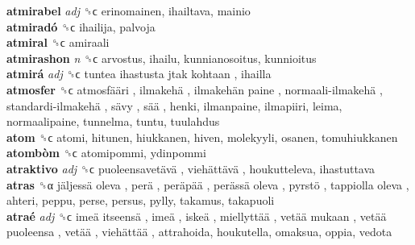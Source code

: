 \textbf{atmirabel} \emph{adj}  ␝ϲ  erinomainen, ihailtava, mainio  \\
\textbf{atmiradó} ␝ϲ  ihailija, palvoja  \\
\textbf{atmiral} ␝ϲ  amiraali  \\
\textbf{atmirashon} \emph{n}  ␝ϲ  arvostus, ihailu, kunnianosoitus, kunnioitus  \\
\textbf{atmirá} \emph{adj}  ␝ϲ   tuntea ihastusta jtak kohtaan , ihailla  \\
\textbf{atmosfer} ␝ϲ   atmosfääri ,  ilmakehä ,  ilmakehän paine ,  normaali-ilmakehä ,  standardi-ilmakehä ,  sävy ,  sää , henki, ilmanpaine, ilmapiiri, leima, normaalipaine, tunnelma, tuntu, tuulahdus  \\
\textbf{atom} ␝ϲ  atomi, hitunen, hiukkanen, hiven, molekyyli, osanen, tomuhiukkanen  \\
\textbf{atombòm} ␝ϲ  atomipommi, ydinpommi  \\
\textbf{atraktivo} \emph{adj}  ␝ϲ   puoleensavetävä ,  viehättävä , houkutteleva, ihastuttava  \\
\textbf{atras} ␝α   jäljessä oleva ,  perä ,  peräpää ,  perässä oleva ,  pyrstö ,  tappiolla oleva , ahteri, peppu, perse, persus, pylly, takamus, takapuoli  \\
\textbf{atraé} \emph{adj}  ␝ϲ   imeä itseensä ,  imeä ,  iskeä ,  miellyttää ,  vetää mukaan ,  vetää puoleensa ,  vetää ,  viehättää , attrahoida, houkutella, omaksua, oppia, vedota  \\
